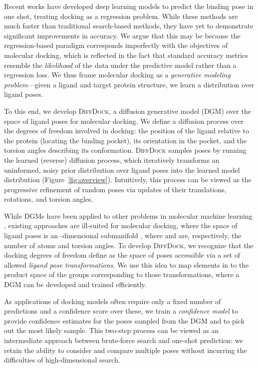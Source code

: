 \documentclass{article} \usepackage{iclr2023_conference,times}
\begin{document}
Recent works \citep{equibind, Lu2022TankBind} have developed deep learning models to predict the binding pose in one shot, treating docking as a regression problem. While these methods are much faster than traditional search-based methods, they have yet to demonstrate significant improvements in accuracy. We argue that this may be because the regression-based paradigm  
corresponds imperfectly with the objectives of molecular docking, which is reflected in the fact that standard accuracy metrics resemble the \emph{likelihood} of the data under the predictive model rather than a regression loss. 
We thus frame molecular docking as a \textit{generative modeling problem}---given a ligand and target protein structure, we learn a distribution over ligand poses. 


To this end, we develop \textsc{DiffDock}, a diffusion generative model (DGM) over the space of ligand poses for molecular docking. We define a diffusion process over the degrees of freedom involved in docking: the position of the ligand relative to the protein (locating the binding pocket), its orientation in the pocket, and the torsion angles describing its conformation. \textsc{DiffDock} samples poses by running the learned (reverse) diffusion process, which iteratively transforms an uninformed, noisy prior distribution over ligand poses into the learned model distribution (Figure~\ref{fig:overview}). Intuitively, this process can be viewed as the progressive refinement of random poses via updates of their translations, rotations, and torsion angles.

While DGMs have been applied to other problems in molecular machine learning \citep{xu2021geodiff,jing2022torsional,hoogeboom2022equivariant}, existing approaches are ill-suited for molecular docking, where the space of ligand poses is an -dimensional submanifold , where  and  are, respectively, the number of atoms and torsion angles. To develop \textsc{DiffDock}, we recognize that the docking degrees of freedom define  as the space of poses accessible via a set of allowed \emph{ligand pose transformations}. We use this idea to map elements in  to the product space of the groups corresponding to those transformations, where a DGM can be developed and trained efficiently.

As applications of docking models often require only a fixed number of predictions and a confidence score over these, we train a \emph{confidence model} to provide confidence estimates for the poses sampled from the DGM and to pick out the most likely sample. This two-step process can be viewed as an intermediate approach between brute-force search and one-shot prediction: we retain the ability to consider and compare multiple poses without incurring the difficulties of high-dimensional search.
\end{document}
